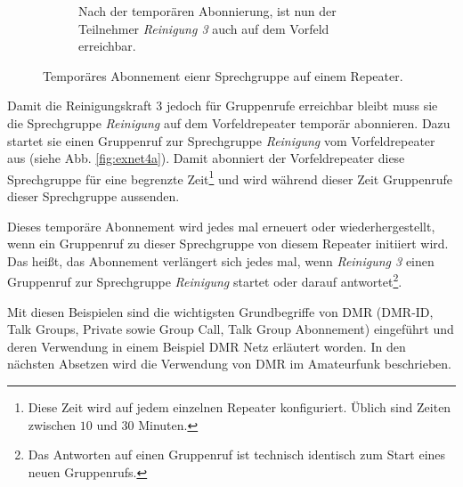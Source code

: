 \begin{figure}[p]
\begin{subfigure}{\linewidth}
  \caption{Nach der temporären Abonnierung, ist nun der Teilnehmer \emph{Reinigung 3} auch auf dem Vorfeld erreichbar.} \label{fig:exnet4b}
 \end{subfigure}
 \caption{Temporäres Abonnement eienr Sprechgruppe auf einem Repeater.} \label{fig:exnet4}
\end{figure}

Damit die Reinigungskraft 3 jedoch für Gruppenrufe erreichbar bleibt muss sie die Sprechgruppe \emph{Reinigung} auf dem Vorfeldrepeater temporär abonnieren. Dazu startet sie einen Gruppenruf zur Sprechgruppe \emph{Reinigung} vom Vorfeldrepeater aus (siehe Abb. \ref{fig:exnet4a}). Damit abonniert der Vorfeldrepeater diese Sprechgruppe für eine begrenzte Zeit\footnote{Diese Zeit wird auf jedem einzelnen Repeater konfiguriert. Üblich sind Zeiten zwischen $10$ und $30$ Minuten.} und wird während dieser Zeit Gruppenrufe dieser Sprechgruppe aussenden. 

Dieses temporäre Abonnement wird jedes mal erneuert oder wiederhergestellt, wenn ein Gruppenruf zu dieser Sprechgruppe von diesem Repeater initiiert wird. Das heißt, das Abonnement verlängert sich jedes mal, wenn \emph{Reinigung 3} einen Gruppenruf zur Sprechgruppe \emph{Reinigung} startet oder darauf antwortet\footnote{Das Antworten auf einen Gruppenruf ist technisch identisch zum Start eines neuen Gruppenrufs.}.

Mit diesen Beispielen sind die wichtigsten Grundbegriffe von DMR (DMR-ID, Talk Groups, Private sowie Group Call, Talk Group Abonnement) eingeführt und deren Verwendung in einem Beispiel DMR Netz erläutert worden. In den nächsten Absetzen wird die Verwendung von DMR im Amateurfunk beschrieben.

